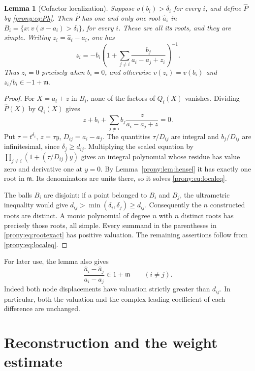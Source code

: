 \documentclass[11pt,letterpaper]{article}
\newtheorem{lemma}[theorem]{Lemma}
\theoremstyle{definition}
\theoremstyle{remark}
\newcommand{\mfr}{\mathfrak m}
\newcommand{\Ph}{\widehat P}
\newcommand{\ah}{\widehat a}
\begin{document}
\begin{lemma}[Cofactor localization]\label{prony:lem:localroots}
Suppose $v(b_i)>\delta_i$ for every $i$, and define $\Ph$ by
\eqref{prony:eq:Ph}. Then $\Ph$ has one and only one root $\ah_i$ in
$B_i=\{x:v(x-a_i)>\delta_i\}$, for every $i$. These are all its roots, and they
are simple. Writing $z_i=\ah_i-a_i$, one has
\begin{equation}\label{prony:eq:rootexact}
 z_i=-b_i\left(1+\sum_{j\ne i}
          \frac{b_j}{a_i-a_j+z_i}\right)^{-1}.
\end{equation}
Thus $z_i=0$ precisely when $b_i=0$, and otherwise
$v(z_i)=v(b_i)$ and $z_i/b_i\in-1+\mfr$.
\end{lemma}
\begin{proof}
For $X=a_i+z$ in $B_i$, none of the factors of $Q_i(X)$ vanishes. Dividing
$\Ph(X)$ by $Q_i(X)$ gives
\begin{equation}\label{prony:eq:localeq}
 z+b_i+\sum_{j\ne i}b_j\frac{z}{a_i-a_j+z}=0.
\end{equation}
Put $\tau=t^{\delta_i}$, $z=\tau y$, $D_{ij}=a_i-a_j$. The quantities
$\tau/D_{ij}$ are integral and $b_j/D_{ij}$ are infinitesimal, since
$\delta_j\ge d_{ij}$. Multiplying the scaled equation by
$\prod_{j\ne i}(1+(\tau/D_{ij})y)$ gives an integral polynomial whose
residue has value zero and derivative one at $y=0$. By
Lemma~\ref{prony:lem:hensel} it has exactly one root in $\mfr$. Its denominators
are units there, so it solves \eqref{prony:eq:localeq}.

The balls $B_i$ are disjoint: if a point belonged to $B_i$ and $B_j$, the
ultrametric inequality would give
$d_{ij}>\min(\delta_i,\delta_j)\ge d_{ij}$. Consequently the $n$ constructed roots
are distinct. A monic polynomial of degree $n$ with $n$ distinct roots
has precisely those roots, all simple. Every summand in the parentheses
in \eqref{prony:eq:rootexact} has positive valuation. The remaining assertions
follow from \eqref{prony:eq:localeq}.
\end{proof}

For later use, the lemma also gives
\begin{equation}\label{prony:eq:separation}
 \frac{\ah_i-\ah_j}{a_i-a_j}\in1+\mfr\qquad(i\ne j).
\end{equation}
Indeed both node displacements have valuation strictly greater than
$d_{ij}$. In particular, both the valuation and the complex leading
coefficient of each difference are unchanged.

\section{Reconstruction and the weight estimate}
\label{prony:sec:mainproof}
\end{document}
